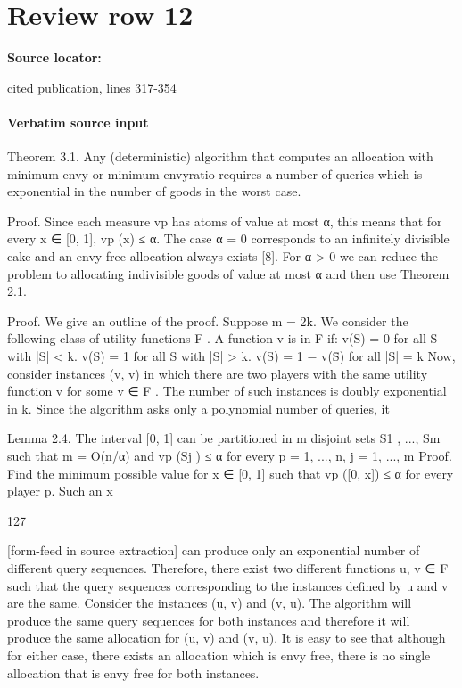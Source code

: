 \documentclass[10pt]{article}
\begin{document}
\section*{Review row 12}
\textbf{Source locator:} {\footnotesize\raggedright cited publication, lines 317-\allowbreak{}354\par}
\paragraph{Verbatim source input}
\begin{ReviewVerbatim}
Theorem 3.1. Any (deterministic) algorithm that computes an allocation with minimum envy or minimum envyratio requires a number of queries which is exponential in
the number of goods in the worst case.

Proof. Since each measure vp has atoms of value at most
α, this means that for every x ∈ [0, 1], vp ({x}) ≤ α. The
case α = 0 corresponds to an infinitely divisible cake and
an envy-free allocation always exists [8]. For α > 0 we can
reduce the problem to allocating indivisible goods of value
at most α and then use Theorem 2.1.

Proof. We give an outline of the proof. Suppose m = 2k.
We consider the following class of utility functions F . A
function v is in F if:
v(S) = 0 for all S with |S| < k.
v(S) = 1 for all S with |S| > k.
v(S) = 1 − v(S̄) for all |S| = k
Now, consider instances (v, v) in which there are two players with the same utility function v for some v ∈ F . The
number of such instances is doubly exponential in k. Since
the algorithm asks only a polynomial number of queries, it

Lemma 2.4. The interval [0, 1] can be partitioned in m
disjoint sets S1 , ..., Sm such that m = O(n/α) and vp (Sj ) ≤
α for every p = 1, ..., n, j = 1, ..., m
Proof. Find the minimum possible value for x ∈ [0, 1]
such that vp ([0, x]) ≤ α for every player p. Such an x

127


[form-feed in source extraction]
can produce only an exponential number of different query
sequences. Therefore, there exist two different functions
u, v ∈ F such that the query sequences corresponding to
the instances defined by u and v are the same.
Consider the instances (u, v) and (v, u). The algorithm
will produce the same query sequences for both instances
and therefore it will produce the same allocation for (u, v)
and (v, u). It is easy to see that although for either case,
there exists an allocation which is envy free, there is no
single allocation that is envy free for both instances.
\end{ReviewVerbatim}
\end{document}
